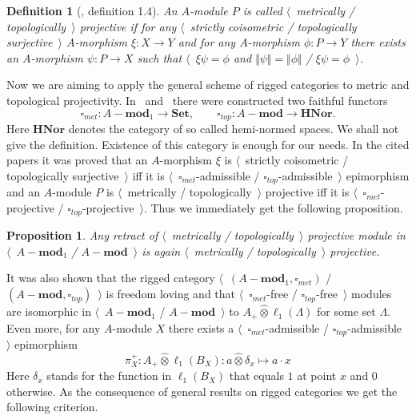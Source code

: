\documentclass[12pt]{article}
\newcommand{\projtens}{\mathbin{\widehat{\otimes}}}
\newtheorem{proposition}[theorem]{Proposition}
\newtheorem{definition}[theorem]{Definition}
\begin{document}
\begin{definition}[\cite{HelMetrFrQMod}, definition 1.4]\label{MetTopProjMod} An
    $A$-module $P$ is called $\langle$~metrically / topologically~$\rangle$
    projective if for any $\langle$~strictly coisometric / topologically
    surjective~$\rangle$ $A$-morphism $\xi:X\to Y$ and for any $A$-morphism
    $\phi:P\to Y$ there exists an $A$-morphism $\psi:P\to X$ such that
    $\langle$~$\xi\psi=\phi$ and $\Vert\psi\Vert=\Vert\phi\Vert$ /
    $\xi\psi=\phi$~$\rangle$.
\end{definition}

Now we are aiming to apply the general scheme of rigged categories to metric and
topological projectivity. In~\cite{HelMetrFrQMod}
and~\cite{ShtTopFrClassicQuantMod} there were constructed two faithful functors
$$
    \square_{met}:A-\mathbf{mod}_1\to\mathbf{Set},
    \qquad
    \square_{top}:A-\mathbf{mod}\to\mathbf{HNor}.
$$
Here $\mathbf{HNor}$ denotes the category of so called hemi-normed spaces. We
shall not give the definition. Existence of this category is enough for our
needs. In the cited papers it was proved that an $A$-morphism $\xi$ is
$\langle$~strictly coisometric / topologically surjective~$\rangle$ iff it is
$\langle$~$\square_{met}$-admissible / $\square_{top}$-admissible~$\rangle$
epimorphism and an $A$-module $P$ is $\langle$~metrically /
topologically~$\rangle$ projective iff it is
$\langle$~$\square_{met}$-projective / $\square_{top}$-projective~$\rangle$.
Thus we immediately get the following proposition.

\begin{proposition}\label{RetrMetTopProjIsMetTopProj} Any retract of
    $\langle$~metrically / topologically~$\rangle$ projective module in
    $\langle$~$A-\mathbf{mod}_1$ / $A-\mathbf{mod}$~$\rangle$ is again $\langle$~metrically /
    topologically~$\rangle$ projective.
\end{proposition}

It was also shown that the rigged category $\langle$~$(A-\mathbf{mod}_1,\square_{met})$
/ $(A-\mathbf{mod},\square_{top})$~$\rangle$ is freedom loving and that
$\langle$~$\square_{met}$-free / $\square_{top}$-free~$\rangle$ modules are
isomorphic in $\langle$~$A-\mathbf{mod}_1$ / $A-\mathbf{mod}$~$\rangle$ to
$A_+\projtens\ell_1(\Lambda)$ for some set $\Lambda$.
Even more, for any $A$-module $X$ there exists a
$\langle$~$\square_{met}$-admissible / $\square_{top}$-admissible~$\rangle$
epimorphism
$$
    \pi_X^+:A_+\projtens \ell_1(B_X):a\projtens \delta_x\mapsto a\cdot x
$$
Here $\delta_x$ stands for the function in $\ell_1(B_X)$ that equals $1$ at
point $x$ and $0$ otherwise. As the consequence of general results on rigged
categories we get the following criterion.
\end{document}
